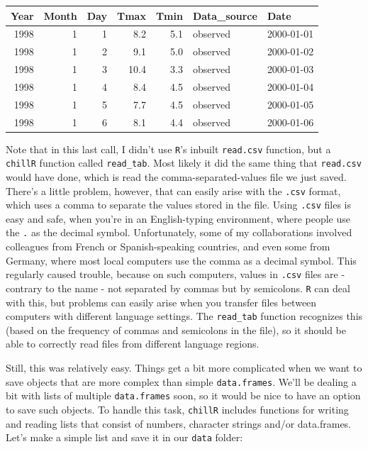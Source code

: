 \documentclass[
]{book}
\begin{document}
\begin{tabular}{r|r|r|r|r|l|l}
\hline
Year & Month & Day & Tmax & Tmin & Data\_source & Date\\
\hline
1998 & 1 & 1 & 8.2 & 5.1 & observed & 2000-01-01\\
\hline
1998 & 1 & 2 & 9.1 & 5.0 & observed & 2000-01-02\\
\hline
1998 & 1 & 3 & 10.4 & 3.3 & observed & 2000-01-03\\
\hline
1998 & 1 & 4 & 8.4 & 4.5 & observed & 2000-01-04\\
\hline
1998 & 1 & 5 & 7.7 & 4.5 & observed & 2000-01-05\\
\hline
1998 & 1 & 6 & 8.1 & 4.4 & observed & 2000-01-06\\
\hline
\end{tabular}
\endgroup{}

Note that in this last call, I didn't use \texttt{R}'s inbuilt \texttt{read.csv} function, but a \texttt{chillR} function called \texttt{read\_tab}. Most likely it did the same thing that \texttt{read.csv} would have done, which is read the comma-separated-values file we just saved. There's a little problem, however, that can easily arise with the \texttt{.csv} format, which uses a comma to separate the values stored in the file. Using \texttt{.csv} files is easy and safe, when you're in an English-typing environment, where people use the \texttt{.} as the decimal symbol. Unfortunately, some of my collaborations involved colleagues from French or Spanish-speaking countries, and even some from Germany, where most local computers use the comma as a decimal symbol. This regularly caused trouble, because on such computers, values in \texttt{.csv} files are - contrary to the name - not separated by commas but by semicolons. \texttt{R} can deal with this, but problems can easily arise when you transfer files between computers with different language settings. The \texttt{read\_tab} function recognizes this (based on the frequency of commas and semicolons in the file), so it should be able to correctly read files from different language regions.

Still, this was relatively easy. Things get a bit more complicated when we want to save objects that are more complex than simple \texttt{data.frames}. We'll be dealing a bit with lists of multiple \texttt{data.frames} soon, so it would be nice to have an option to save such objects. To handle this task, \texttt{chillR} includes functions for writing and reading lists that consist of numbers, character strings and/or data.frames. Let's make a simple list and save it in our \texttt{data} folder:
\end{document}
